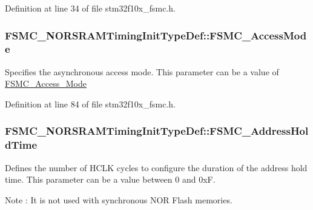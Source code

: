 Definition at line 34 of file stm32f10x\+\_\+fsmc.\+h.

\subsubsection[{\texorpdfstring{F\+S\+M\+C\+\_\+\+Access\+Mode}{FSMC_AccessMode}}]{ F\+S\+M\+C\+\_\+\+N\+O\+R\+S\+R\+A\+M\+Timing\+Init\+Type\+Def\+::\+F\+S\+M\+C\+\_\+\+Access\+Mode}\hypertarget{struct_f_s_m_c___n_o_r_s_r_a_m_timing_init_type_def_a261d043a19cecf77e6859403be204efc}{}\label{struct_f_s_m_c___n_o_r_s_r_a_m_timing_init_type_def_a261d043a19cecf77e6859403be204efc}
Specifies the asynchronous access mode. This parameter can be a value of \hyperlink{group___f_s_m_c___access___mode}{F\+S\+M\+C\+\_\+\+Access\+\_\+\+Mode} 

Definition at line 84 of file stm32f10x\+\_\+fsmc.\+h.

\subsubsection[{\texorpdfstring{F\+S\+M\+C\+\_\+\+Address\+Hold\+Time}{FSMC_AddressHoldTime}}]{ F\+S\+M\+C\+\_\+\+N\+O\+R\+S\+R\+A\+M\+Timing\+Init\+Type\+Def\+::\+F\+S\+M\+C\+\_\+\+Address\+Hold\+Time}\hypertarget{struct_f_s_m_c___n_o_r_s_r_a_m_timing_init_type_def_ac030a512b4d7cf3eb18f1c2b4f2d7456}{}\label{struct_f_s_m_c___n_o_r_s_r_a_m_timing_init_type_def_ac030a512b4d7cf3eb18f1c2b4f2d7456}
Defines the number of H\+C\+LK cycles to configure the duration of the address hold time. This parameter can be a value between 0 and 0xF. \begin{DoxyNote}{Note}
\+: It is not used with synchronous N\+OR Flash memories. 
\end{DoxyNote}


